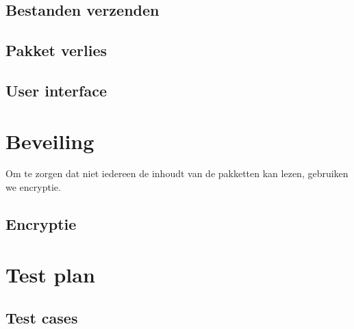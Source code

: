 \documentclass{article}
\begin{document}
\subsection{Bestanden verzenden}

\subsection{Pakket verlies}

\subsection{User interface}


\section{Beveiling}
Om te zorgen dat niet iedereen de inhoudt van de pakketten kan lezen, gebruiken we encryptie. 

\subsection{Encryptie}


\section{Test plan}


\subsection{Test cases}
\end{document}
